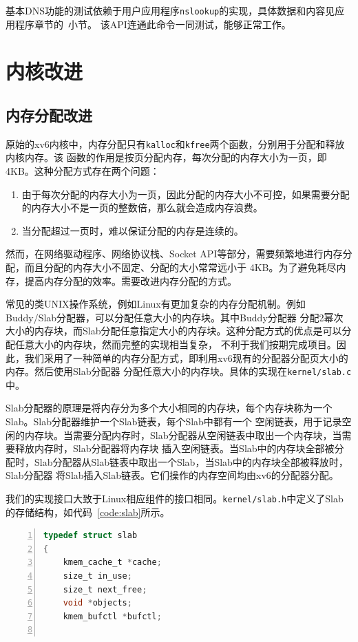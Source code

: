 \documentclass[a4paper,twoside]{ctexrep}
\begin{document}
\begin{spacing}{1.2}
基本DNS功能的测试依赖于用户应用程序\texttt{nslookup}的实现，具体数据和内容见应用程序章节的~小节。
该API连通此命令一同测试，能够正常工作。

\section{内核改进}
\label{sec:kernel}

\subsection{内存分配改进}

原始的xv6内核中，内存分配只有\texttt{kalloc}和\texttt{kfree}两个函数，分别用于分配和释放内核内存。该
函数的作用是按页分配内存，每次分配的内存大小为一页，即4KB。这种分配方式存在两个问题：
\begin{enumerate}
	\item 由于每次分配的内存大小为一页，因此分配的内存大小不可控，如果需要分配的内存大小不是一页的整数倍，那么就会造成内存浪费。
	\item 当分配超过一页时，难以保证分配的内存是连续的。
\end{enumerate}
然而，在网络驱动程序、网络协议栈、Socket API等部分，需要频繁地进行内存分配，而且分配的内存大小不固定、分配的大小常常远小于
4KB。为了避免耗尽内存，提高内存分配的效率。需要改进内存分配的方式。

常见的类UNIX操作系统，例如Linux有更加复杂的内存分配机制。例如Buddy/Slab分配器，可以分配任意大小的内存块。其中Buddy分配器
分配2幂次大小的内存块，而Slab分配任意指定大小的内存块。这种分配方式的优点是可以分配任意大小的内存块，然而完整的实现相当复杂，
不利于我们按期完成项目。因此，我们采用了一种简单的内存分配方式，即利用xv6现有的分配器分配页大小的内存。然后使用Slab分配器
分配任意大小的内存块。具体的实现在\texttt{kernel/slab.c}中。

Slab分配器的原理是将内存分为多个大小相同的内存块，每个内存块称为一个Slab。Slab分配器维护一个Slab链表，每个Slab中都有一个
空闲链表，用于记录空闲的内存块。当需要分配内存时，Slab分配器从空闲链表中取出一个内存块，当需要释放内存时，Slab分配器将内存块
插入空闲链表。当Slab中的内存块全部被分配时，Slab分配器从Slab链表中取出一个Slab，当Slab中的内存块全部被释放时，Slab分配器
将Slab插入Slab链表。它们操作的内存空间均由xv6的分配器分配。

我们的实现接口大致于Linux相应组件的接口相同。\texttt{kernel/slab.h}中定义了Slab的存储结构，如代码~\ref{code:slab}所示。
\begin{lstlisting}[numbers=left,style=CppStyle,caption={Slab的存储结构},label={code:slab},language=C]
typedef struct slab
{
	kmem_cache_t *cache;
	size_t in_use;
	size_t next_free;
	void *objects;
	kmem_bufctl *bufctl;


\end{lstlisting}
\end{spacing}
\end{document}
